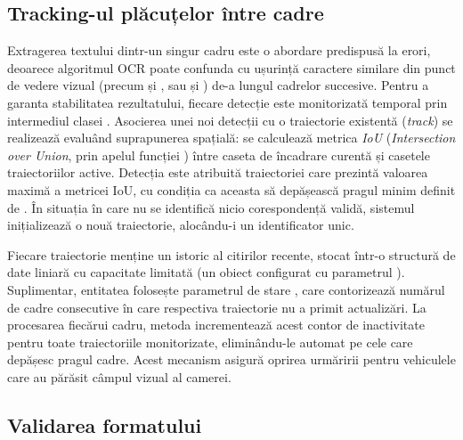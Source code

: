 \documentclass[../../main.tex]{subfiles}
\begin{document}
\subsection{Tracking-ul plăcuțelor între cadre}
\label{subsec:tracking_placute}

Extragerea textului dintr-un singur cadru este o abordare predispusă la erori, deoarece algoritmul OCR poate confunda cu ușurință caractere similare din punct de vedere vizual (precum  și , sau  și ) de-a lungul cadrelor succesive. Pentru a garanta stabilitatea rezultatului, fiecare detecție este monitorizată temporal prin intermediul clasei . Asocierea unei noi detecții cu o traiectorie existentă (\emph{track}) se realizează evaluând suprapunerea spațială: se calculează metrica \emph{IoU} (\emph{Intersection over Union}, prin apelul funcției ) între caseta de încadrare curentă și casetele traiectoriilor active. Detecția este atribuită traiectoriei care prezintă valoarea maximă a metricei IoU, cu condiția ca aceasta să depășească pragul minim definit de . În situația în care nu se identifică nicio corespondență validă, sistemul inițializează o nouă traiectorie, alocându-i un identificator unic.

Fiecare traiectorie menține un istoric al citirilor recente, stocat într-o structură de date liniară cu capacitate limitată (un obiect  configurat cu parametrul ). Suplimentar, entitatea folosește parametrul de stare , care contorizează numărul de cadre consecutive în care respectiva traiectorie nu a primit actualizări. La procesarea fiecărui cadru, metoda  incrementează acest contor de inactivitate pentru toate traiectoriile monitorizate, eliminându-le automat pe cele care depășesc pragul  cadre. Acest mecanism asigură oprirea urmăririi pentru vehiculele care au părăsit câmpul vizual al camerei.

\subsection{Validarea formatului}
\label{subsec:validare_format}
\end{document}
